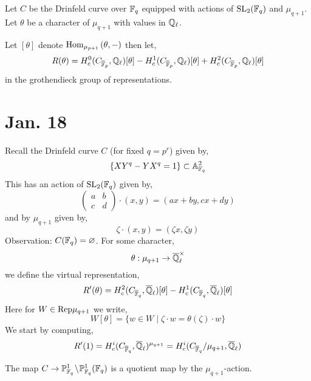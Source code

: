 \documentclass[12pt]{article}
\begin{document}
Let $C$ be the Drinfeld curve over $\mathbb{F}_q$ equipped with actions of $\mathrm{SL}_2(\mathbb{F}_q)$ and $\mu_{q+1}$. Let $\theta$ be a character of $\mu_{q+1}$ with values in $\mathbb{Q}_\ell$. 

\begin{defn}
Let $[\theta]$ denote $\mathrm{Hom}_{\mu_{p+1}} \left( \theta, - \right)$ then let,
\[ R(\theta) = H^0_c(C_{\overline{\mathbb{F}}_p}, \mathbb{Q}_\ell) [ \theta] - H^1_c(C_{\overline{\mathbb{F}}_p}, \mathbb{Q}_\ell)[\theta] + H^2_c(C_{\overline{\mathbb{F}}_p}, \mathbb{Q}_\ell)[\theta] \]
in the grothendieck group of representations. 
\end{defn}

\section{Jan. 18}

\newcommand{\FFbar}{\overline{\FF}}
\newcommand{\lbar}[1]{\overline{#1}}
\newcommand{\Qbar}{\lbar{\QQ}}

Recall the Drinfeld curve $C$ (for fixed $q = p^r$) given by,
\[ \{ X Y^q - Y X^q = 1 \} \subset \mathbb{A}^2_{\mathbb{F}_q} \]
This has an action of $\mathrm{SL}_2(\mathbb{F}_q)$ given by,
\[ \begin{pmatrix}
a & b
\\
c & d
\end{pmatrix}
\cdot (x, y) = (a x + by, c x + d y) \]
and by $\mu_{q + 1}$ given by,
\[ \zeta \cdot (x, y) = (\zeta x, \zeta y) \]
Observation: $C(\mathbb{F}_q) = \varnothing$. For some character, 
\[ \theta : \mu_{q + 1} \to \Qbar_\ell^\times \]
we define the virtual representation,
\[ R'(\theta) = H^2_c(C_{\overline{\FF}_q}, \Qbar_\ell)[\theta] - H^1_c(C_{\overline{\FF}_q}, \Qbar_\ell)[\theta] \]
Here for $W \in \mathrm{Rep}{\mu_{q+1}}$ we write,
\[ W[\theta] = \{ w \in W \mid \zeta \cdot w = \theta(\zeta) \cdot w \} \]
We start by computing,
\[ R'(1) = H^i_c(C_{\FFbar_q}, \Qbar_\ell)^{\mu_{q+1}} = H^i_c(C_{\FFbar_{q}} / \mu_{q+1}, \Qbar_\ell) \]

\begin{lemma}
The map $C \to \mathbb{P}^1_{\mathbb{F}_q} \! \setminus \! \mathbb{P}^1_{\mathbb{F}_q}(\mathbb{F}_q)$ is a quotient map by the $\mu_{q+1}$-action. 
\end{lemma}
\end{document}
